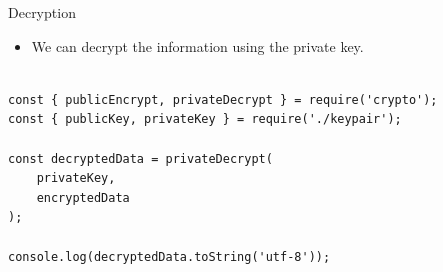 \begin{frame}[fragile]{Decryption}

\begin{itemize}
	\item We can decrypt the information using the private key. 
\end{itemize}

\begin{Code}{}%
\begin{lstlisting}[firstnumber=1, label=glabels, xleftmargin=0pt, basicstyle=\scriptsize]% 

const { publicEncrypt, privateDecrypt } = require('crypto');
const { publicKey, privateKey } = require('./keypair');

const decryptedData = privateDecrypt(
    privateKey,
    encryptedData
);

console.log(decryptedData.toString('utf-8'));
\end{lstlisting}%
\end{Code}%

\end{frame}